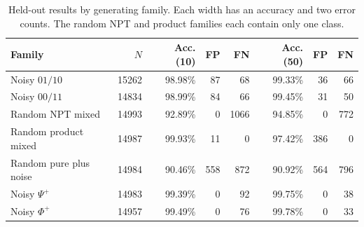 \begin{table}[htbp]
\centering\small
\begin{tabular}{lrrrrrrr}
\toprule
Family & $N$ & Acc. (10) & FP & FN & Acc. (50) & FP & FN \\
\midrule
Noisy $01/10$ & 15262 & 98.98\% & 87 & 68 & 99.33\% & 36 & 66 \\
Noisy $00/11$ & 14834 & 98.99\% & 84 & 66 & 99.45\% & 31 & 50 \\
Random NPT mixed & 14993 & 92.89\% & 0 & 1066 & 94.85\% & 0 & 772 \\
Random product mixed & 14987 & 99.93\% & 11 & 0 & 97.42\% & 386 & 0 \\
Random pure plus noise & 14984 & 90.46\% & 558 & 872 & 90.92\% & 564 & 796 \\
Noisy $\Psi^+$ & 14983 & 99.39\% & 0 & 92 & 99.75\% & 0 & 38 \\
Noisy $\Phi^+$ & 14957 & 99.49\% & 0 & 76 & 99.78\% & 0 & 33 \\
\bottomrule
\end{tabular}
\caption{Held-out results by generating family. Each width has an accuracy and two error counts. The random NPT and product families each contain only one class.}
\label{tab:family-results}
\end{table}
